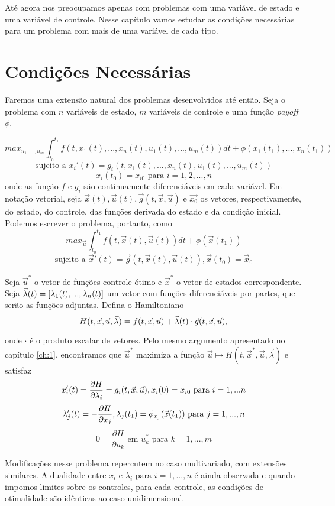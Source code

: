 Até agora nos preocupamos apenas com problemas com uma variável de estado e
uma variável de controle. Nesse capítulo vamos estudar as condições
necessárias para um problema com mais de uma variável de cada tipo. 

\section{Condições Necessárias}

Faremos uma extensão natural dos problemas desenvolvidos até então. Seja o
problema com $n$ variáveis de estado, $m$ variáveis de controle e uma função
\textit{payoff} $\phi$. 

$$
max_{u_1,...,u_m} \int_{t_0}^{t_1} f(t,x_1(t),...,x_n(t),u_1(t),...,u_m(t)) dt + \phi(x_1(t_1),...,x_n(t_1))
$$
$$
\text{sujeito a   }x_i'(t) = g_i(t,x_1(t),...,x_n(t),u_1(t),...,u_m(t))
$$
$$
x_i(t_0) = x_{i0} \text{ para }i=1,2,...,n
$$
onde as função $f$ e $g_i$ são continuamente diferenciáveis em cada variável.
Em notação vetorial, seja $\vec{x}(t), \vec{u}(t), \vec{g}(t,\vec{x},\vec{u})
\text{ e } \vec{x_0}$ os vetores, respectivamente, do estado, do controle, das
funções derivada do estado e da condição inicial. Podemos escrever o problema,
portanto, como 
$$
max_{\vec{u}} \int_{t_0}^{t_1} f(t,\vec{x}(t),\vec{u}(t)) dt + \phi(\vec{x}(t_1))
$$
$$
\text{sujeito a   }\vec{x}'(t) = \vec{g}(t,\vec{x}(t), \vec{u}(t)), \vec{x}(t_0) = \vec{x}_{0} 
$$


Seja $\vec{u}^*$ o vetor de funções controle ótimo e $\vec{x}^*$ o vetor de
estados correspondente. Seja $\vec{\lambda}(t) = [\lambda_1(t),...,\lambda_n(t)]$ um vetor
com funções diferenciáveis por partes, que serão as funções adjuntas. Defina o
Hamiltoniano
$$H(t,\vec{x},\vec{u},\vec{\lambda}) = f(t,\vec{x},\vec{u}) + \vec{\lambda}(t)\cdot
\vec{g}(t,\vec{x},\vec{u}),$$

onde $\cdot$ é o produto escalar de vetores. Pelo mesmo argumento apresentado
no capítulo \ref{ch:1}, encontramos que $\vec{u}^*$ maximiza a função $\vec{u}
\mapsto H(t, \vec{x}^*, \vec{u}, \vec{\lambda})$ e satisfaz 
$$
x'_i(t) = \frac{\partial H}{\partial \lambda_i} = g_i(t,\vec{x},\vec{u}), x_i(0) = x_{i0} \text{ para }i = 1,...n 
$$
$$
\lambda'_j(t) = - \frac{\partial H}{\partial x_j}, \lambda_j(t_1) = \phi_{x_j}(\vec{x}(t_1)) \text{ para }j=1,...,n
$$
$$
0 = \frac{\partial H}{\partial u_k} \text{ em }u^*_k \text{ para }k=1,...,m
$$

Modificações nesse problema repercutem no caso multivariado, com extensões
similares. A dualidade entre $x_i$ e $\lambda_i \text{ para }i=1,...,n$ é
ainda observada e quando impomos limites sobre os controles, para cada
controle, as condições de otimalidade são idênticas ao caso unidimensional. 

